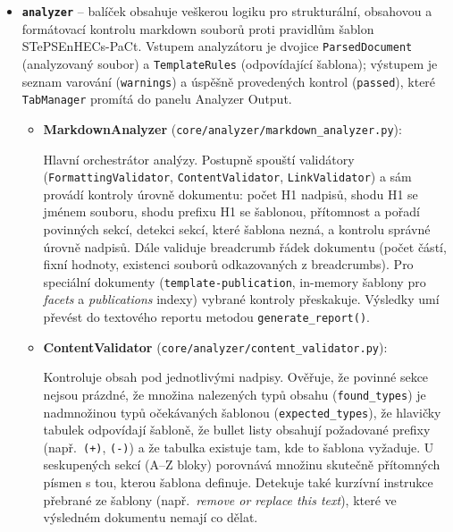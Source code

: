 \documentclass[12pt, a4paper]{article}
\begin{document}
\begin{itemize}

    \item \textbf{\texttt{analyzer}} -- balíček obsahuje veškerou logiku pro strukturální, obsahovou
    a formátovací kontrolu markdown souborů proti pravidlům šablon STePSEnHECs-PaCt. Vstupem analyzátoru
    je dvojice \texttt{ParsedDocument} (analyzovaný soubor) a \texttt{TemplateRules} (odpovídající šablona);
    výstupem je seznam varování (\texttt{warnings}) a úspěšně provedených kontrol (\texttt{passed}), které
    \texttt{TabManager} promítá do panelu Analyzer Output.

    \begin{itemize}
        \item \textbf{MarkdownAnalyzer} (\texttt{core/analyzer/markdown\_analyzer.py}):

        Hlavní orchestrátor analýzy. Postupně spouští validátory
        (\texttt{FormattingValidator}, \texttt{ContentValidator}, \texttt{LinkValidator}) a sám provádí
        kontroly úrovně dokumentu: počet H1 nadpisů, shodu H1 se jménem souboru, shodu prefixu H1
        se šablonou, přítomnost a pořadí povinných sekcí, detekci sekcí, které šablona nezná, a kontrolu
        správné úrovně nadpisů. Dále validuje breadcrumb řádek dokumentu (počet částí, fixní hodnoty,
        existenci souborů odkazovaných z breadcrumbs). Pro speciální dokumenty
        (\texttt{template-publication}, in-memory šablony pro \emph{facets} a \emph{publications} indexy)
        vybrané kontroly přeskakuje. Výsledky umí převést do textového reportu
        metodou \texttt{generate\_report()}.

        \item \textbf{ContentValidator} (\texttt{core/analyzer/content\_validator.py}):

        Kontroluje obsah pod jednotlivými nadpisy. Ověřuje, že povinné sekce nejsou prázdné, že množina
        nalezených typů obsahu (\texttt{found\_types}) je nadmnožinou typů očekávaných šablonou
        (\texttt{expected\_types}), že hlavičky tabulek odpovídají šabloně, že bullet listy obsahují
        požadované prefixy (např.\ \texttt{(+)}, \texttt{(-)}) a že tabulka existuje tam, kde to šablona
        vyžaduje. U seskupených sekcí (A--Z bloky) porovnává množinu skutečně přítomných písmen s tou,
        kterou šablona definuje. Detekuje také kurzívní instrukce přebrané ze šablony
        (např.\ \emph{remove or replace this text}), které ve výsledném dokumentu nemají co dělat.


\end{itemize}
\end{itemize}
\end{document}
